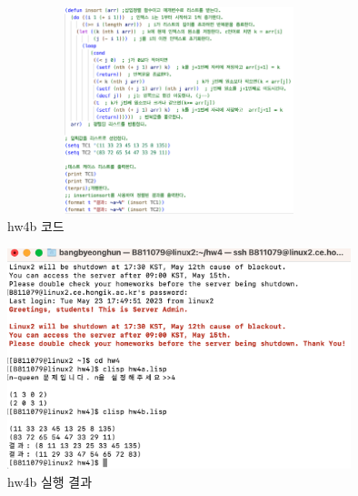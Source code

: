 \documentclass{article}
\begin{document}
\newpage
\begin{figure}[h]
    \centering
    \includegraphics[width = 10cm,height = 6cm]{hw4b_code.png}
    \caption{hw4b 코드}
    \label{fig:fig4}
\end{figure}
\begin{figure}[h]
    \centering
    \includegraphics[width = 10cm]{hw4b_run.png}
    \caption{hw4b 실행 결과}
    \label{fig:fig5}
\end{figure}
\end{document}
